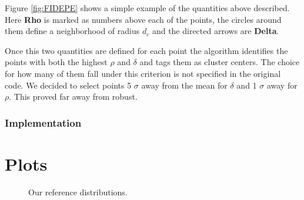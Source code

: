 \documentclass[12pt]{article}
\begin{document}
Figure \ref{fig:FIDEPE} shows a simple example of the quantities above described. Here \textbf{Rho} is marked as numbers above each of the points, the circles around them define a neighborhood of radius $d_c$ and the directed arrows are \textbf{Delta}.


Once this two quantities are defined for each point the algorithm identifies the points with both the highest \textbf{$\rho$} and \textbf{$\delta$} and tags them as cluster centers. The choice for how many of them fall under this criterion is not specified in the original code. We decided to select points 5 $\sigma$ away from the mean for \textbf{$\delta$} and 1 $\sigma$ away for \textbf{$\rho$}. This proved far away from robust.
\subsubsection{Implementation}
\singlespacing


\section{Plots}

\begin{figure}[ht]
\centering
\caption{Our reference distributions.}
\label{fig:reference}
\end{figure}
\end{document}

